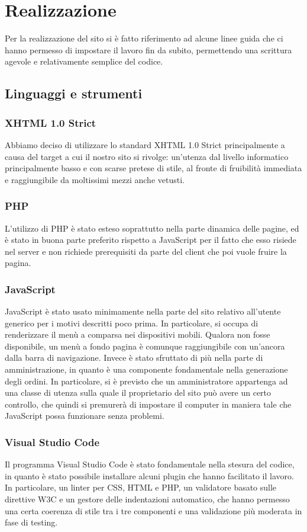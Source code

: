 \newpage
\section{Realizzazione}
Per la realizzazione del sito si è fatto riferimento ad alcune linee guida che ci hanno permesso di impostare il lavoro fin da subito, permettendo una scrittura agevole e relativamente semplice del codice.
\subsection{Linguaggi e strumenti}
\subsubsection{XHTML 1.0 Strict}
Abbiamo deciso di utilizzare lo standard XHTML 1.0 Strict principalmente a causa del target a cui il nostro sito si rivolge: un'utenza dal livello informatico principalmente basso e con scarse pretese di stile, al fronte di fruibilità immediata e raggiungibile da moltissimi mezzi anche vetusti.
\subsubsection{PHP}
L'utilizzo di PHP è stato esteso soprattutto nella parte dinamica delle pagine, ed è stato in buona parte preferito rispetto a JavaScript per il fatto che esso risiede nel server e non richiede prerequisiti da parte del client che poi vuole fruire la pagina.
\subsubsection{JavaScript}
JavaScript è stato usato minimamente nella parte del sito relativo all'utente generico per i motivi descritti poco prima. In particolare, si occupa di renderizzare il menù a comparsa nei dispositivi mobili. Qualora non fosse disponibile, un menù a fondo pagina è comunque raggiungibile con un'ancora dalla barra di navigazione. Invece è stato sfruttato di più nella parte di amministrazione, in quanto è una componente fondamentale nella generazione degli ordini. In particolare, si è previsto che un amministratore appartenga ad una classe di utenza sulla quale il proprietario del sito può avere un certo controllo, che quindi si premurerà di impostare il computer in maniera tale che JavaScript possa funzionare senza problemi.
\subsubsection{Visual Studio Code}
Il programma Visual Studio Code è stato fondamentale nella stesura del codice, in quanto è stato possibile installare alcuni plugin che hanno facilitato il lavoro. In particolare, un linter per CSS, HTML e PHP, un validatore basato sulle direttive W3C e un gestore delle indentazioni automatico, che hanno permesso una certa coerenza di stile tra i tre componenti e una validazione più moderata in fase di testing.
